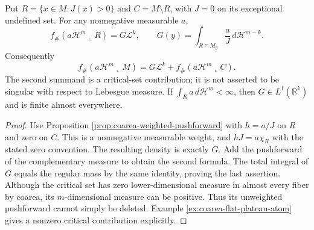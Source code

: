 \begin{proposition}\label{prop:coarea-inverse-jacobian}
Put $R=\{x\in M:J(x)>0\}$ and $C=M\setminus R$, with $J=0$ on its exceptional undefined set. For any nonnegative measurable $a$,
\[
 f_\#(a\mathcal H^m\llcorner R)=G\mathcal L^k,
 \qquad G(y)=\int_{R\cap M_y}\frac{a}{J}\,d\mathcal H^{m-k}.
\]
Consequently
\[
 f_\#(a\mathcal H^m\llcorner M)=G\mathcal L^k+f_\#(a\mathcal H^m\llcorner C).
\]
The second summand is a critical-set contribution; it is not asserted to be singular with respect to Lebesgue measure. If $\int_Ra\,d\mathcal H^m<\infty$, then $G\in L^1(\mathbb R^k)$ and is finite almost everywhere.
\end{proposition}
\begin{proof}
Use Proposition \ref{prop:coarea-weighted-pushforward} with $h=a/J$ on $R$ and zero on $C$. This is a nonnegative measurable weight, and $hJ=a\chi_R$ with the stated zero convention. The resulting density is exactly $G$. Add the pushforward of the complementary measure to obtain the second formula. The total integral of $G$ equals the regular mass by the same identity, proving the last assertion. Although the critical set has zero lower-dimensional measure in almost every fiber by coarea, its $m$-dimensional measure can be positive. Thus its unweighted pushforward cannot simply be deleted. Example \ref{ex:coarea-flat-plateau-atom} gives a nonzero critical contribution explicitly.
\end{proof}

